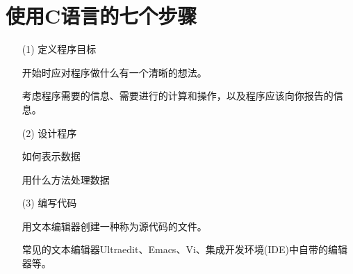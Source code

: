 \section{使用C语言的七个步骤}
 

\begin{frame}\ft{\secname}
  
\begin{itemize}
\item[(1)] 定义程序目标\\[0.1in]
\item[] 开始时应对程序做什么有一个清晰的想法。\\[0.1in]
\item[] 考虑程序需要的信息、需要进行的计算和操作，以及程序应该向你报告的信息。
\end{itemize}
      
\end{frame}
 

\begin{frame}\ft{\secname}
  
\begin{itemize}
\item[(2)] 设计程序\\[0.1in]
\item[] 如何表示数据   \\[0.1in]
\item[] 用什么方法处理数据  \\[0.1in]
\item[] 
\end{itemize}

\end{frame}


\begin{frame}\ft{\secname}
  
 \begin{itemize}
\item[(3)] 编写代码\\[0.1in]
\item[] 用文本编辑器创建一种称为源代码的文件。
\item[] 常见的文本编辑器Ultraedit、Emacs、Vi、集成开发环境(IDE)中自带的编辑器等。
\end{itemize}
  
\end{frame}


